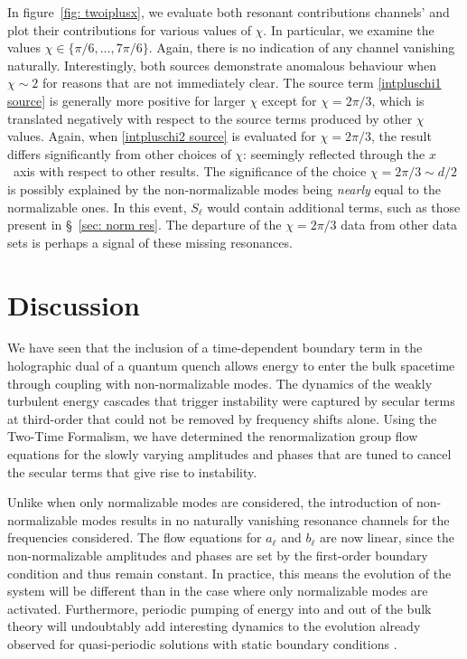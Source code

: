\documentclass[../PhD.tex]{subfiles}
\begin{document}
In figure~\ref{fig: twoiplusx}, we evaluate both resonant contributions channels' and plot their contributions for various values of $\chi$. In particular, we examine the values $\chi \in \{ \pi/6, \ldots, 7\pi/6 \}$. Again, there is no indication of any channel vanishing naturally. Interestingly, both sources demonstrate anomalous behaviour when $\chi \sim 2$ for reasons that are not immediately clear. The source term \eqref{intpluschi1 source} is generally more positive for larger $\chi$ except for $\chi = 2 \pi / 3$, which is translated negatively with respect to the source terms produced by other $\chi$ values. Again, when \eqref{intpluschi2 source} is evaluated for $\chi = 2 \pi/3$, the result differs significantly from other choices of $\chi$: seemingly reflected through the $x$~axis with respect to other results. The significance of the choice $\chi = 2\pi / 3 \sim d / 2$ is possibly explained by the non-normalizable modes being \emph{nearly} equal to the normalizable ones. In this event, $S_\ell$ would contain additional terms, such as those present in \S~\!\ref{sec: norm res}. The departure of the $\chi = 2\pi/3$ data from other data sets is perhaps a signal of these missing resonances.


\section{Discussion}
\label{sec: discussion}

We have seen that the inclusion of a time-dependent boundary term in the holographic dual of a quantum quench allows energy to enter the bulk spacetime through coupling with non-normalizable modes. The dynamics of the weakly turbulent energy cascades that trigger instability were captured by secular terms at third-order that could not be removed by frequency shifts alone. Using the Two-Time Formalism, we have determined the renormalization group flow equations for the slowly varying amplitudes and phases that are tuned to cancel the secular terms that give rise to instability. 

Unlike when only normalizable modes are considered, the introduction of non-normalizable modes results in no naturally vanishing resonance channels for the frequencies considered. The flow equations for $a_\ell$ and $b_\ell$ are now linear, since the non-normalizable amplitudes and phases are set by the first-order boundary condition and thus remain constant. In practice, this means the evolution of the system will be different than in the case where only normalizable modes are activated. Furthermore, periodic pumping of energy into and out of the bulk theory will undoubtably add interesting dynamics to the evolution already observed for quasi-periodic solutions with static boundary conditions \cite{TTF}.
\end{document}
